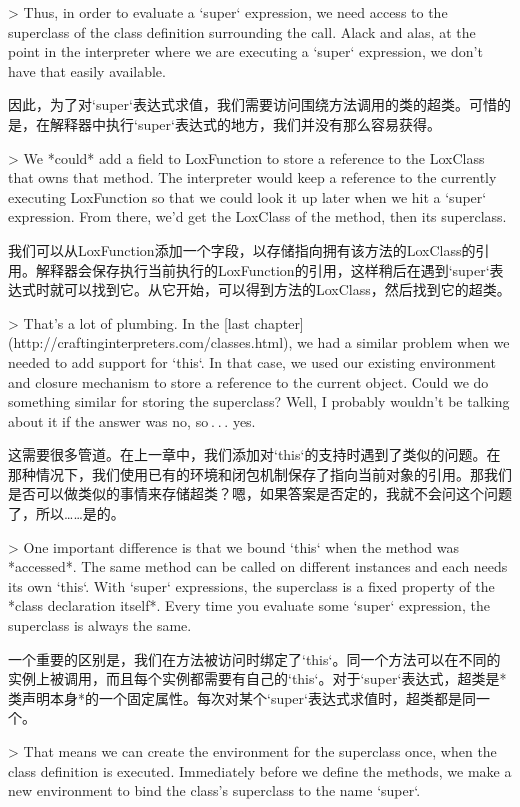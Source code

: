\documentclass[cn,11pt,chinese]{elegantbook}
\begin{document}
> Thus, in order to evaluate a `super` expression, we need access to the superclass of the class definition surrounding the call. Alack and alas, at the point in the interpreter where we are executing a `super` expression, we don’t have that easily available.

因此，为了对`super`表达式求值，我们需要访问围绕方法调用的类的超类。可惜的是，在解释器中执行`super`表达式的地方，我们并没有那么容易获得。

> We *could* add a field to LoxFunction to store a reference to the LoxClass that owns that method. The interpreter would keep a reference to the currently executing LoxFunction so that we could look it up later when we hit a `super` expression. From there, we’d get the LoxClass of the method, then its superclass.

我们可以从LoxFunction添加一个字段，以存储指向拥有该方法的LoxClass的引用。解释器会保存执行当前执行的LoxFunction的引用，这样稍后在遇到`super`表达式时就可以找到它。从它开始，可以得到方法的LoxClass，然后找到它的超类。

> That’s a lot of plumbing. In the [last chapter](http://craftinginterpreters.com/classes.html), we had a similar problem when we needed to add support for `this`. In that case, we used our existing environment and closure mechanism to store a reference to the current object. Could we do something similar for storing the superclass? Well, I probably wouldn’t be talking about it if the answer was no, so . . . yes.

这需要很多管道。在上一章中，我们添加对`this`的支持时遇到了类似的问题。在那种情况下，我们使用已有的环境和闭包机制保存了指向当前对象的引用。那我们是否可以做类似的事情来存储超类？嗯，如果答案是否定的，我就不会问这个问题了，所以……是的。

> One important difference is that we bound `this` when the method was *accessed*. The same method can be called on different instances and each needs its own `this`. With `super` expressions, the superclass is a fixed property of the *class declaration itself*. Every time you evaluate some `super` expression, the superclass is always the same.

一个重要的区别是，我们在方法被访问时绑定了`this`。同一个方法可以在不同的实例上被调用，而且每个实例都需要有自己的`this`。对于`super`表达式，超类是*类声明本身*的一个固定属性。每次对某个`super`表达式求值时，超类都是同一个。

> That means we can create the environment for the superclass once, when the class definition is executed. Immediately before we define the methods, we make a new environment to bind the class’s superclass to the name `super`.
\end{document}
